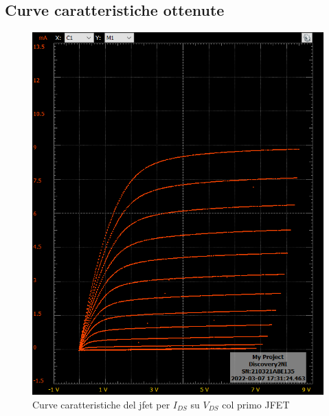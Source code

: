 \documentclass[10pt, a4paper, italian]{article}
\begin{document}
\subsection{Curve caratteristiche ottenute}
\begin{figure}[htbp]
    \centering
	\includegraphics[scale=0.4]{xy}
    \caption{Curve caratteristiche del jfet per $I_{DS}$ su $V_{DS}$ col primo JFET}
\end{figure}
\end{document}

